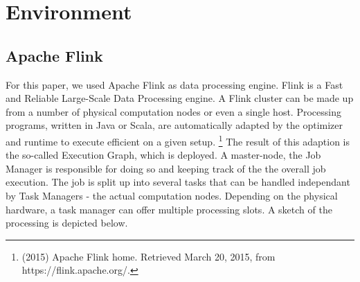 \section{Environment}
\subsection{Apache Flink}
For this paper, we used Apache Flink as data processing engine. Flink is a Fast and Reliable
Large-Scale Data Processing engine. A Flink cluster can be made up from a number of physical
computation nodes or even a single host. Processing programs, written in Java or Scala, are
automatically adapted by the optimizer and runtime to execute efficient on a given setup.
\footnote{(2015) Apache Flink home. Retrieved March 20, 2015, from https://flink.apache.org/.}
The result of this adaption is the so-called Execution Graph, which is deployed. A master-node, the
Job Manager is responsible for doing so and keeping track of the the overall job execution. The job
is split up into several tasks that can be handled independant by Task Managers - the actual
computation nodes.  Depending on the physical hardware, a task manager can offer multiple processing
slots. A sketch of the processing is depicted below.
